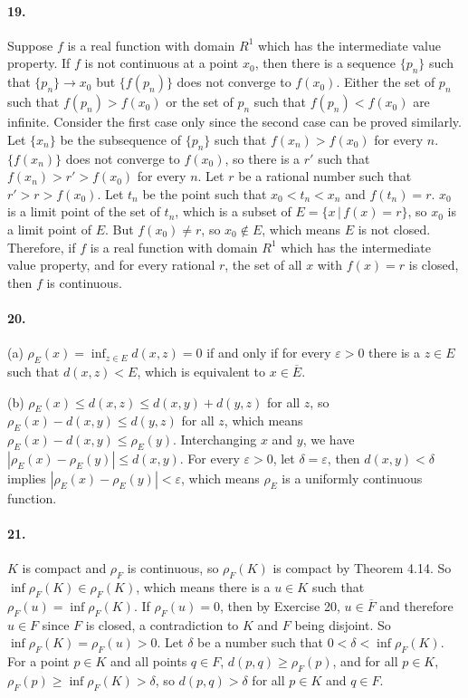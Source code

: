 \documentclass[a4paper]{article}
\begin{document}
\paragraph{19.}
Suppose $f$ is a real function with domain $R^1$ which has the intermediate value property. If $f$ is not continuous at a point $x_0$, then there is a sequence $\{p_n\}$ such that $\{p_n\}\to x_0$ but $\{f(p_n)\}$ does not converge to $f(x_0)$. Either the set of $p_n$ such that $f(p_n)>f(x_0)$ or the set of $p_n$ such that $f(p_n)<f(x_0)$ are infinite. Consider the first case only since the second case can be proved similarly. Let $\{x_n\}$ be the subsequence of $\{p_n\}$ such that $f(x_n)>f(x_0)$ for every $n$.\; $\{f(x_n)\}$ does not converge to $f(x_0)$, so there is a $r'$ such that $f(x_n)>r'>f(x_0)$ for every $n$. Let $r$ be a rational number such that $r'>r>f(x_0)$. Let $t_n$ be the point such that $x_0<t_n<x_n$ and $f(t_n)=r$.\; $x_0$ is a limit point of the set of $t_n$, which is a subset of $E=\{x\,|\,f(x)=r\}$, so $x_0$ is a limit point of $E$. But $f(x_0)\neq r$, so $x_0\not\in E$, which means $E$ is not closed. Therefore, if $f$ is a real function with domain $R^1$ which has the intermediate value property, and for every rational $r$, the set of all $x$ with $f(x)=r$ is closed, then $f$ is continuous.

\paragraph{20.}
(a) $\rho_E(x)=\inf_{z\in E}d(x,z)=0$ if and only if for every $\varepsilon>0$ there is a $z\in E$ such that $d(x,z)<E$, which is equivalent to $x\in\overline{E}$.

(b) $\rho_E(x)\leq d(x,z)\leq d(x,y)+d(y,z)$ for all $z$, so $\rho_E(x)-d(x,y)\leq d(y,z)$ for all $z$, which means $\rho_E(x)-d(x,y)\leq\rho_E(y)$. Interchanging $x$ and $y$, we have $|\rho_E(x)-\rho_E(y)|\leq d(x,y)$. For every $\varepsilon>0$, let $\delta=\varepsilon$, then $d(x,y)<\delta$ implies $|\rho_E(x)-\rho_E(y)|<\varepsilon$, which means $\rho_E$ is a uniformly continuous function.

\paragraph{21.}
$K$ is compact and $\rho_F$ is continuous, so $\rho_F(K)$ is compact by Theorem 4.14. So $\inf\rho_F(K)\in\rho_F(K)$, which means there is a $u\in K$ such that $\rho_F(u)=\inf \rho_F(K)$. If $\rho_F(u)=0$, then by Exercise 20, $u\in\overline{F}$ and therefore $u\in F$ since $F$ is closed, a contradiction to $K$ and $F$ being disjoint. So $\inf\rho_F(K)=\rho_F(u)>0$. Let $\delta$ be a number such that $0<\delta<\inf\rho_F(K)$. For a point $p\in K$ and all points $q\in F$,\; $d(p,q)\geq \rho_F(p)$, and for all $p\in K$,\; $\rho_F(p)\geq \inf\rho_F(K)>\delta$, so $d(p,q)>\delta$ for all $p\in K$ and $q\in F$.
\smallskip
\end{document}
